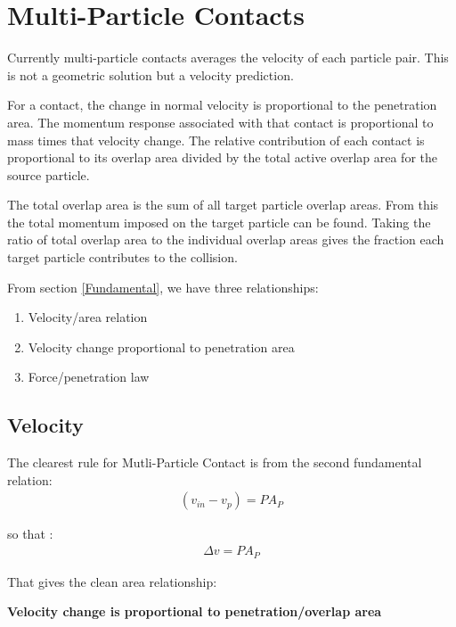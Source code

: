 \section{Multi-Particle Contacts}

Currently multi-particle contacts averages the velocity of each particle pair.    
This is not a geometric solution but a velocity prediction. 

For a contact, the change in normal velocity is proportional to the penetration area. 
The momentum response associated with that contact is proportional to mass times that velocity change.
The relative contribution of each contact is proportional to its overlap area divided by the total active overlap area for the source particle.

The total overlap area is the sum of all target particle
overlap areas. From this the total momentum imposed on the target particle can be found.
Taking the ratio of total overlap area to the individual overlap areas gives the fraction
each target particle contributes to the collision.

From section \ref{Fundamental}, we have three relationships:
\begin{enumerate}
\item Velocity/area relation
\item Velocity change proportional to penetration area
\item Force/penetration law
\end{enumerate}

\subsection{Velocity}

The clearest rule for Mutli-Particle Contact is from the second fundamental relation:
\begin{equation}
\begin{aligned}
(v_{in} - v_p) = P A_P
\end{aligned}
\end{equation}

so that :
\begin{equation}
\begin{aligned}
\Delta v = P A_P
\end{aligned}
\end{equation}

That gives the clean area relationship:

\textbf{Velocity change is proportional to penetration/overlap area}


